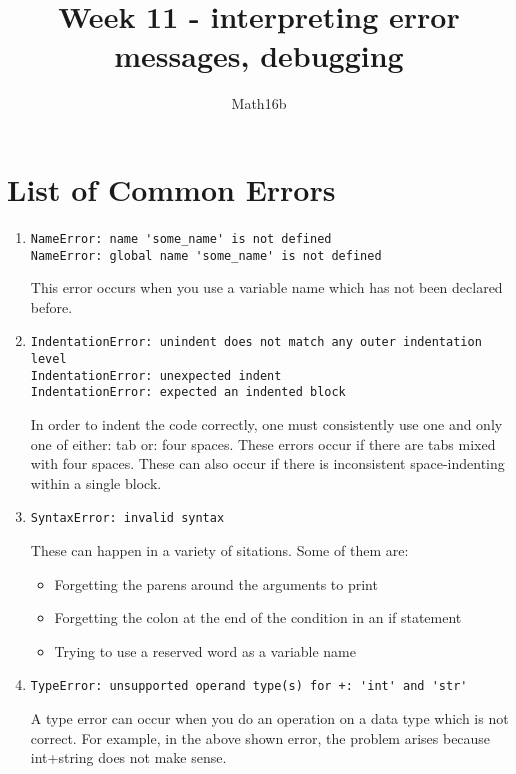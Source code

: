 \documentclass{article}
\title{Week 11 - interpreting error messages, debugging}
\author{Math16b}
\date{}
\begin{document}
\maketitle


\section{List of Common Errors}
\begin{enumerate}
    \item    \begin{lstlisting} 
NameError: name 'some_name' is not defined
NameError: global name 'some_name' is not defined
    \end{lstlisting}
    This error occurs when you use a variable name which has not been declared before.
    
    \item \begin{lstlisting} 
IndentationError: unindent does not match any outer indentation level
IndentationError: unexpected indent
IndentationError: expected an indented block

    \end{lstlisting}
     In order to indent the code correctly, one must consistently use one and only one of either: tab or: four spaces. These errors occur if there are tabs mixed with four spaces. These can also occur if there is inconsistent space-indenting within a single block.
     
     \item \begin{lstlisting}
SyntaxError: invalid syntax
     \end{lstlisting}
     These can happen in a variety of sitations. Some of them are:
     \begin{itemize}
         \item Forgetting the parens around the arguments to print
         \item Forgetting the colon at the end of the condition in an if statement
         \item Trying to use a reserved word as a variable name

     \end{itemize}
     
    \item \begin{lstlisting}
TypeError: unsupported operand type(s) for +: 'int' and 'str'

    \end{lstlisting}
    A type error can occur when you do an operation on a data type which is not correct. For example, in the above shown error, the problem arises because int+string does not make sense.
    

\end{enumerate}
\end{document}
